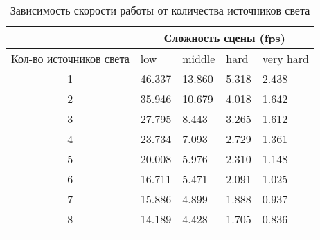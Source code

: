 \begin{center}
\begin{longtable}{|c|p{2cm}|p{2cm}|p{2cm}|p{2cm}|}
\hline & \multicolumn{4}{c|}{Сложность сцены (fps)} \\ 
\hline Кол-во источников света & low & middle & hard &  very hard\\ 
\hline 1 &  46.337 & 13.860 & 5.318 & 2.438 \\ 
\hline 2 &  35.946 & 10.679 & 4.018 & 1.642 \\ 
\hline 3 &  27.795 & 8.443 & 3.265 & 1.612 \\ 
\hline 4 &  23.734 & 7.093 & 2.729 & 1.361 \\ 
\hline 5 &  20.008 & 5.976 & 2.310 & 1.148 \\ 
\hline 6 &  16.711 & 5.471 & 2.091 & 1.025 \\ 
\hline 7 &  15.886 & 4.899 & 1.888 & 0.937 \\ 
\hline 8 &  14.189 & 4.428 & 1.705 & 0.836 \\ 
\hline
\caption{Зависимость скорости работы от количества источников света}\label{tab:performance_light}\end{longtable}
\end{center}

